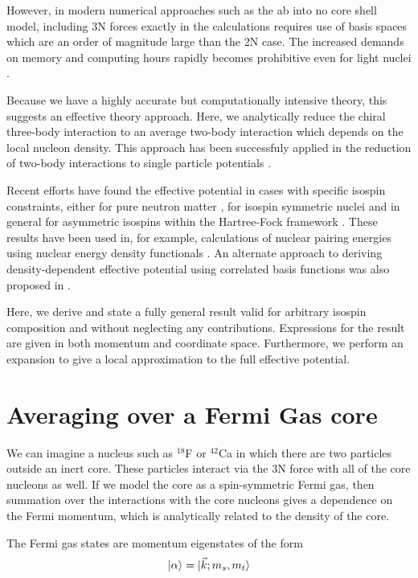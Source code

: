\documentclass[%
 preprint,
 amsmath,amssymb,
 aps,
]{revtex4-1}
\begin{document}
However, in modern numerical approaches such as the ab into no core shell model, including 3N forces exactly in the calculations requires use of basis spaces which are an order of magnitude large than the 2N case. The increased demands on memory and computing hours  rapidly becomes prohibitive even for light nuclei \cite{Barrett2013131}. 

Because we have a highly accurate but computationally intensive theory, this suggests an effective theory approach. Here, we analytically reduce the chiral three-body interaction to an average two-body interaction which depends on the local nucleon density. This approach has been successfuly applied in the reduction of two-body interactions to single particle potentials \cite{PhysRev.133.B329,AdelbergerHaxton}.

Recent efforts have found the effective potential in cases with specific isospin constraints, either for pure neutron matter \cite{PhysRevC.82.014314}, for isospin symmetric nuclei \cite{PhysRevC.81.024002} and in general for asymmetric isospins within the Hartree-Fock framework \cite{Drischler:2015eba}. These results have been used in, for example, calculations of nuclear pairing energies using nuclear energy density functionals \cite{0954-3899-39-1-015108}. An alternate approach to deriving density-dependent effective potential using correlated basis functions was also proposed in \cite{PhysRevC.83.054003}.

Here, we derive and state a fully general result valid for arbitrary isospin composition and without neglecting any contributions. Expressions for the result are given in both momentum and coordinate space. Furthermore, we perform an expansion to give a local approximation to the full effective potential.

\section{Averaging over a Fermi Gas core}

We can imagine a nucleus such as $^{18}$F or $^{42}$Ca in which there are two particles outside an inert core. These particles interact via the 3N force with all of the core nucleons as well. If we model the core as a spin-symmetric Fermi gas, then summation over the interactions with the core nucleons gives a dependence on the Fermi momentum, which is analytically related to the density of the core. 

The Fermi gas states are momentum eigenstates of the form
\begin{equation}
\ket{\alpha}=\ket{\vec{k};m_s,m_t}
\end{equation}
\end{document}
